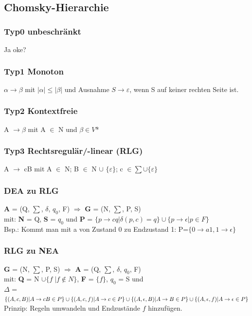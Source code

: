 \documentclass[12pt,a4paper]{article}
\begin{document}
	\subsection{Chomsky-Hierarchie}
	\subsubsection{Typ0 unbeschränkt}
	Ja oke?

    \subsubsection{Typ1 Monoton}
    $\alpha \rightarrow \beta$ mit $| \alpha | \leq  | \beta |$ und Ausnahme $S \rightarrow \varepsilon$, wenn S auf keiner rechten Seite ist.

    \subsubsection{Typ2 Kontextfreie}
	A $\rightarrow \beta$ mit A $\in$ N und $\beta \in V$* 

    \subsubsection{Typ3 Rechtsregulär/-linear (RLG)}
	A $\rightarrow$ cB mit A $\in$ N; B $\in$ N $\cup$ $\{ \varepsilon \}$; c $\in \sum \cup \{ \varepsilon \}$

	\subsubsection{DEA zu RLG}
	\textbf{A} = (Q, $\sum$, $\delta$, $q_0$, F) $\Rightarrow$ \textbf{G} = (N, $\sum$, P, S)\\
	mit: \textbf{N} = Q, \textbf{S} = $q_0$ und \textbf{P} = $\{p \rightarrow cq | \delta (p, c) = q\} \cup \{p \rightarrow \epsilon | p \in F\}$ \\
	Bsp.: Kommt man mit a von Zustand 0 zu Endzustand 1: P=$\{ 0 \rightarrow a1, 1 \rightarrow \epsilon \}$

	\subsubsection{RLG zu NEA}
	\textbf{G} = (N, $\sum$, P, S) $\Rightarrow$ \textbf{A} = (Q, $\sum$, $\delta$, $q_0$, F)  \\
	mit: \textbf{Q} = N $\cup\{f \; | f \notin N\}$, \textbf{F} = $\{f\}$, $q_0$ = S und\\
	$\Delta$ = $\{ (A, c, B) | A \rightarrow cB \in P\} \cup \\
	\{ (A, c, f) | A \rightarrow c \in P\} \cup \\
	\{ (A, \epsilon, B) | A \rightarrow B \in P\} \cup \\ 
	\{ (A, \epsilon, f) | A \rightarrow \epsilon \in P\}$
	Prinzip: Regeln umwandeln und Endzustände $f$ hinzufügen.
\end{document}
